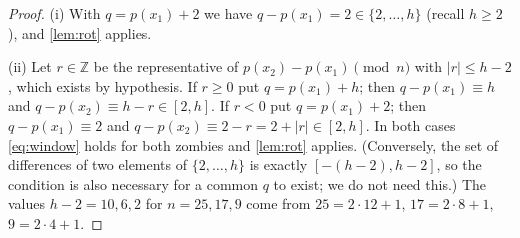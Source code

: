 \documentclass[11pt,a4paper]{article}
\theoremstyle{plain}
\theoremstyle{definition}
\theoremstyle{remark}
\newcommand{\Z}{\mathbb Z}
\begin{document}
\correot*
\begin{proof}
(i) With $q=p(x_1)+2$ we have $q-p(x_1)=2\in\{2,\dots,h\}$ (recall $h\ge2$), and \cref{lem:rot} applies.

(ii) Let $r\in\Z$ be the representative of $p(x_2)-p(x_1)\pmod n$ with $|r|\le h-2$, which exists by hypothesis. If $r\ge0$ put $q=p(x_1)+h$; then $q-p(x_1)\equiv h$ and $q-p(x_2)\equiv h-r\in[2,h]$. If $r<0$ put $q=p(x_1)+2$; then $q-p(x_1)\equiv2$ and $q-p(x_2)\equiv2-r=2+|r|\in[2,h]$. In both cases \eqref{eq:window} holds for both zombies and \cref{lem:rot} applies. (Conversely, the set of differences of two elements of $\{2,\dots,h\}$ is exactly $[-(h-2),h-2]$, so the condition is also necessary for a common $q$ to exist; we do not need this.) The values $h-2=10,6,2$ for $n=25,17,9$ come from $25=2\cdot12+1$, $17=2\cdot8+1$, $9=2\cdot4+1$.
\end{proof}
\end{document}
